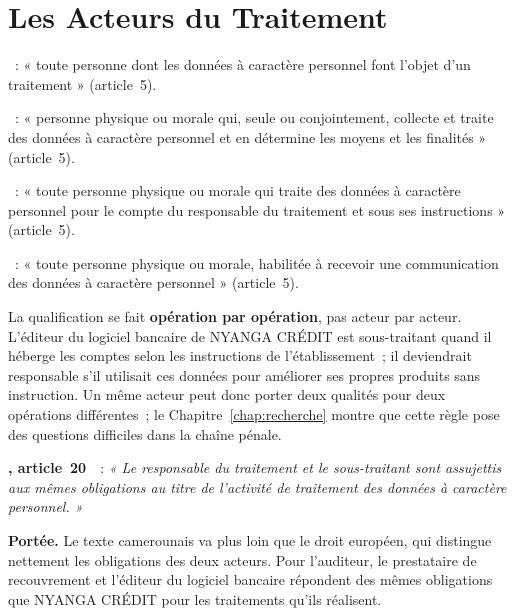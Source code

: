 \section{Les Acteurs du Traitement}
\label{sec:c01-acteurs}

\begin{boxdef}
~: « toute personne dont les données à
caractère personnel font l'objet d'un traitement » (article~5).

\smallskip
{}~: « personne physique ou morale qui,
seule ou conjointement, collecte et traite des données à caractère
personnel et en détermine les moyens et les finalités » (article~5).

\smallskip
{}~: « toute personne physique ou morale qui traite des
données à caractère personnel pour le compte du responsable du traitement
et sous ses instructions » (article~5).

\smallskip
{}~: « toute personne physique ou morale, habilitée à
recevoir une communication des données à caractère personnel »
(article~5).
\end{boxdef}

La qualification se fait \textbf{opération par opération}, pas acteur par
acteur. L'éditeur du logiciel bancaire de NYANGA CRÉDIT est sous-traitant
quand il héberge les comptes selon les instructions de l'établissement~; il
deviendrait responsable s'il utilisait ces données pour améliorer ses
propres produits sans instruction. Un même acteur peut donc porter deux
qualités pour deux opérations différentes~; le Chapitre~\ref{chap:recherche}
montre que cette règle pose des questions difficiles dans la chaîne
pénale.

\begin{boxjuris}
\textbf{, article~20}~\cite{loi2024017}~:
\textit{« Le responsable du traitement et le sous-traitant sont assujettis
aux mêmes obligations au titre de l'activité de traitement des données à
caractère personnel. »}

\smallskip
\textbf{Portée.} Le texte camerounais va plus loin que le droit européen,
qui distingue nettement les obligations des deux acteurs. Pour l'auditeur,
le prestataire de recouvrement et l'éditeur du logiciel bancaire répondent
des mêmes obligations que NYANGA CRÉDIT pour les traitements qu'ils
réalisent.
\end{boxjuris}

